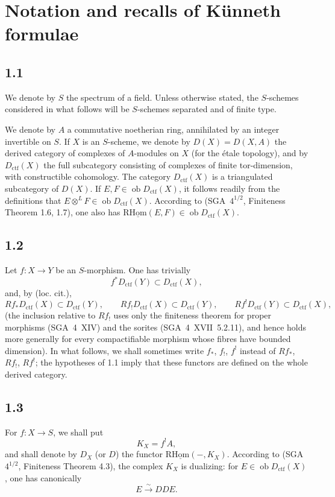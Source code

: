 \documentclass[11pt]{article}
\newcommand{\ob}{\operatorname{ob}}
\providecommand{\ctf}{\mathrm{ctf}}
\providecommand{\ob}{\operatorname{ob}}
\begin{document}
\setcounter{section}{0}
\section{Notation and recalls of Künneth formulae}

\subsection*{1.1}
We denote by $S$ the spectrum of a field. Unless otherwise stated, the $S$-schemes considered in what follows will be $S$-schemes separated and of finite type.

We denote by $A$ a commutative noetherian ring, annihilated by an integer invertible on $S$. If $X$ is an $S$-scheme, we denote by $D(X)=D(X,A)$ the derived category of complexes of $A$-modules on $X$ (for the étale topology), and by $D_{\ctf}(X)$ the full subcategory consisting of complexes of finite tor-dimension, with constructible cohomology. The category $D_{\ctf}(X)$ is a triangulated subcategory of $D(X)$. If $E,F\in\ob D_{\ctf}(X)$, it follows readily from the definitions that $E\otimes^L F\in\ob D_{\ctf}(X)$. According to (SGA~$4^{1/2}$, Finiteness Theorem 1.6, 1.7), one also has $\mathrm{R}\underline{\mathrm{Hom}}(E,F)\in\ob D_{\ctf}(X)$.

\subsection*{1.2}
Let $f:X\to Y$ be an $S$-morphism. One has trivially
\[
f^{*}D_{\ctf}(Y) \subset D_{\ctf}(X),
\]
and, by (loc. cit.),
\[
Rf_{*}D_{\ctf}(X) \subset D_{\ctf}(Y),\qquad
Rf_{!}D_{\ctf}(X) \subset D_{\ctf}(Y),\qquad
Rf^{!}D_{\ctf}(Y) \subset D_{\ctf}(X),
\]
(the inclusion relative to $Rf_{!}$ uses only the finiteness theorem for proper morphisms (SGA~4~XIV) and the sorites (SGA~4~XVII~5.2.11), and hence holds more generally for every compactifiable morphism whose fibres have bounded dimension). In what follows, we shall sometimes write $f_{*}$, $f_{!}$, $f^{!}$ instead of $Rf_{*}$, $Rf_{!}$, $Rf^{!}$; the hypotheses of 1.1 imply that these functors are defined on the whole derived category.

\subsection*{1.3}
For $f:X\to S$, we shall put
\[
K_X=f^{!}A,
\]
and shall denote by $D_X$ (or $D$) the functor $\mathrm{R}\underline{\mathrm{Hom}}(-,K_X)$. According to (SGA~$4^{1/2}$, Finiteness Theorem 4.3), the complex $K_X$ is dualizing: for $E\in\ob D_{\ctf}(X)$, one has canonically
\[
E \xrightarrow{\sim} DDE.
\]
\end{document}
